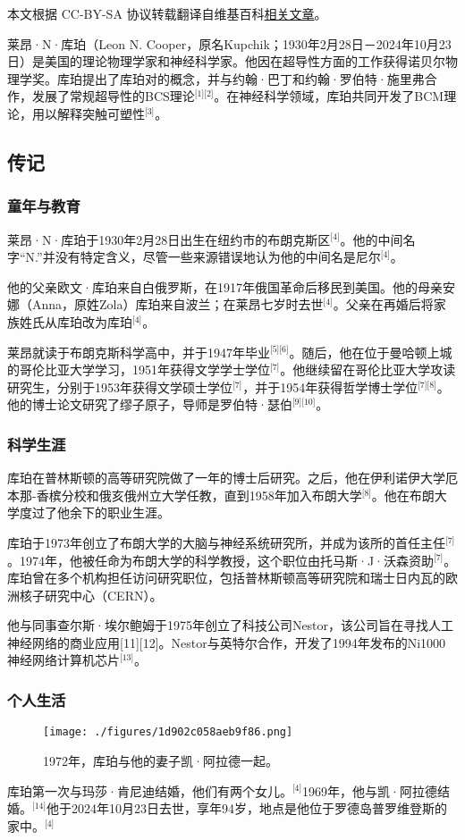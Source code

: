 
本文根据 CC-BY-SA 协议转载翻译自维基百科\href{https://en.wikipedia.org/wiki/Leon_Cooper}{相关文章}。

莱昂·N·库珀（Leon N. Cooper，原名Kupchik；1930年2月28日－2024年10月23日）是美国的理论物理学家和神经科学家。他因在超导性方面的工作获得诺贝尔物理学奖。库珀提出了库珀对的概念，并与约翰·巴丁和约翰·罗伯特·施里弗合作，发展了常规超导性的BCS理论\(^\text{[1][2]}\)。在神经科学领域，库珀共同开发了BCM理论，用以解释突触可塑性\(^\text{[3]}\)。
\subsection{传记}
\subsubsection{童年与教育}
莱昂·N·库珀于1930年2月28日出生在纽约市的布朗克斯区\(^\text{[4]}\)。他的中间名字“N.”并没有特定含义，尽管一些来源错误地认为他的中间名是尼尔\(^\text{[4]}\)。

他的父亲欧文·库珀来自白俄罗斯，在1917年俄国革命后移民到美国。他的母亲安娜（Anna，原姓Zola）库珀来自波兰；在莱昂七岁时去世\(^\text{[4]}\)。父亲在再婚后将家族姓氏从库珀改为库珀\(^\text{[4]}\)。

莱昂就读于布朗克斯科学高中，并于1947年毕业\(^\text{[5][6]}\)。随后，他在位于曼哈顿上城的哥伦比亚大学学习，1951年获得文学学士学位\(^\text{[7]}\)。他继续留在哥伦比亚大学攻读研究生，分别于1953年获得文学硕士学位\(^\text{[7]}\)，并于1954年获得哲学博士学位\(^\text{[7][8]}\)。他的博士论文研究了缪子原子，导师是罗伯特·瑟伯\(^\text{[9][10]}\)。
\subsubsection{科学生涯}
库珀在普林斯顿的高等研究院做了一年的博士后研究。之后，他在伊利诺伊大学厄本那-香槟分校和俄亥俄州立大学任教，直到1958年加入布朗大学\(^\text{[8]}\)。他在布朗大学度过了他余下的职业生涯。

库珀于1973年创立了布朗大学的大脑与神经系统研究所，并成为该所的首任主任\(^\text{[7]}\)。1974年，他被任命为布朗大学的科学教授，这个职位由托马斯·J·沃森资助\(^\text{[7]}\)。库珀曾在多个机构担任访问研究职位，包括普林斯顿高等研究院和瑞士日内瓦的欧洲核子研究中心（CERN）。

他与同事查尔斯·埃尔鲍姆于1975年创立了科技公司Nestor，该公司旨在寻找人工神经网络的商业应用[11][12]。Nestor与英特尔合作，开发了1994年发布的Ni1000神经网络计算机芯片\(^\text{[13]}\)。
\subsubsection{个人生活}
\begin{figure}[ht]
\centering
\texttt{[image: ./figures/1d902c058aeb9f86.png]}
\caption{1972年，库珀与他的妻子凯·阿拉德一起。} \label{fig_LAkb_1}
\end{figure}
库珀第一次与玛莎·肯尼迪结婚，他们有两个女儿。\(^\text{[4]}\)1969年，他与凯·阿拉德结婚。\(^\text{[14]}\)他于2024年10月23日去世，享年94岁，地点是他位于罗德岛普罗维登斯的家中。\(^\text{[4]}\)
